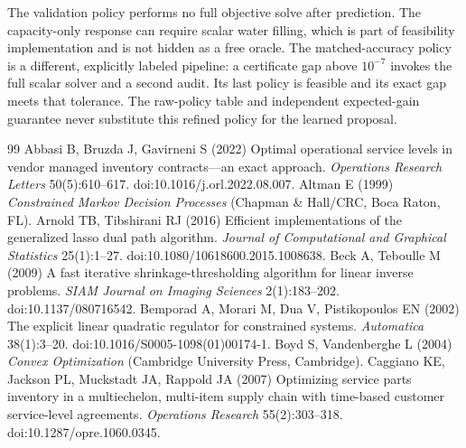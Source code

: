 \documentclass[11pt,letterpaper]{article}
\theoremstyle{definition}
\newcommand{\1}{\mathbf 1}
\begin{document}
The validation policy performs no full objective solve after prediction. The capacity-only response can require scalar water filling, which is part of feasibility implementation and is not hidden as a free oracle. The matched-accuracy policy is a different, explicitly labeled pipeline: a certificate gap above $10^{-7}$ invokes the full scalar solver and a second audit. Its last policy is feasible and its exact gap meets that tolerance. The raw-policy table and independent expected-gain guarantee never substitute this refined policy for the learned proposal.


\clearpage
\begin{thebibliography}{99}
Abbasi B, Bruzda J, Gavirneni S (2022) Optimal operational service levels in vendor managed inventory contracts---an exact approach. \emph{Operations Research Letters} 50(5):610--617. doi:10.1016/j.orl.2022.08.007.
Altman E (1999) \emph{Constrained Markov Decision Processes} (Chapman \& Hall/CRC, Boca Raton, FL).
Arnold TB, Tibshirani RJ (2016) Efficient implementations of the generalized lasso dual path algorithm. \emph{Journal of Computational and Graphical Statistics} 25(1):1--27. doi:10.1080/10618600.2015.1008638.
Beck A, Teboulle M (2009) A fast iterative shrinkage-thresholding algorithm for linear inverse problems. \emph{SIAM Journal on Imaging Sciences} 2(1):183--202. doi:10.1137/080716542.
Bemporad A, Morari M, Dua V, Pistikopoulos EN (2002) The explicit linear quadratic regulator for constrained systems. \emph{Automatica} 38(1):3--20. doi:10.1016/S0005-1098(01)00174-1.
Boyd S, Vandenberghe L (2004) \emph{Convex Optimization} (Cambridge University Press, Cambridge).
Caggiano KE, Jackson PL, Muckstadt JA, Rappold JA (2007) Optimizing service parts inventory in a multiechelon, multi-item supply chain with time-based customer service-level agreements. \emph{Operations Research} 55(2):303--318. doi:10.1287/opre.1060.0345.

\end{thebibliography}
\end{document}
